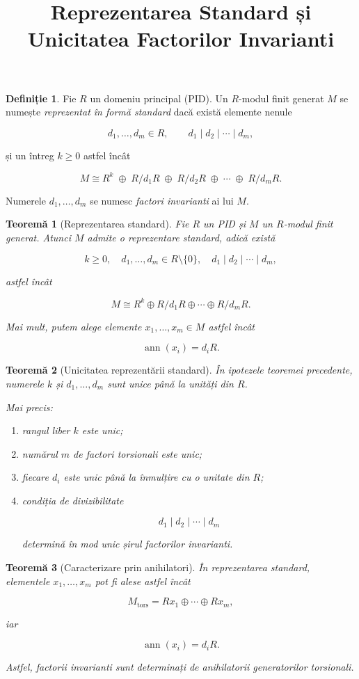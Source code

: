 \documentclass[12pt]{article}
\title{Reprezentarea Standard și Unicitatea Factorilor Invarianti}
\author{}
\date{}
\theoremstyle{definition}
\newtheorem{definition}{Definiție}
\theoremstyle{plain}
\newtheorem{theorem}{Teoremă}
\begin{document}
\maketitle

\begin{definition}
Fie $R$ un domeniu principal (PID). Un $R$-modul finit generat $M$ se numește
\emph{reprezentat în formă standard} dacă există elemente nenule


\[
d_1, \dots, d_m \in R, \qquad d_1 \mid d_2 \mid \cdots \mid d_m,
\]


și un întreg $k \ge 0$ astfel încât


\[
M \cong R^k \;\oplus\; R/d_1 R \;\oplus\; R/d_2 R \;\oplus\; \cdots \;\oplus\; R/d_m R.
\]


Numerele $d_1, \dots, d_m$ se numesc \emph{factori invarianti} ai lui $M$.
\end{definition}

\begin{theorem}[Reprezentarea standard]
Fie $R$ un PID și $M$ un $R$-modul finit generat. Atunci $M$ admite o reprezentare standard, adică există


\[
k \ge 0,\quad d_1, \dots, d_m \in R \setminus \{0\},\quad d_1 \mid d_2 \mid \cdots \mid d_m,
\]


astfel încât


\[
M \cong R^k \oplus R/d_1 R \oplus \cdots \oplus R/d_m R.
\]


Mai mult, putem alege elemente $x_1, \dots, x_m \in M$ astfel încât


\[
\operatorname{ann}(x_i) = d_i R.
\]


\end{theorem}

\begin{theorem}[Unicitatea reprezentării standard]
În ipotezele teoremei precedente, numerele $k$ și $d_1, \dots, d_m$ sunt unice
până la unități din $R$.

Mai precis:
\begin{enumerate}
    \item[(i)] rangul liber $k$ este unic;
    \item[(ii)] numărul $m$ de factori torsionali este unic;
    \item[(iii)] fiecare $d_i$ este unic până la înmulțire cu o unitate din $R$;
    \item[(iv)] condiția de divizibilitate
    

\[
    d_1 \mid d_2 \mid \cdots \mid d_m
    \]


    determină în mod unic șirul factorilor invarianti.
\end{enumerate}
\end{theorem}

\begin{theorem}[Caracterizare prin anihilatori]
În reprezentarea standard, elementele $x_1, \dots, x_m$ pot fi alese astfel încât


\[
M_{\text{tors}} = Rx_1 \oplus \cdots \oplus Rx_m,
\]


iar


\[
\operatorname{ann}(x_i) = d_i R.
\]


Astfel, factorii invarianti sunt determinați de anihilatorii generatorilor torsionali.
\end{theorem}
\end{document}
